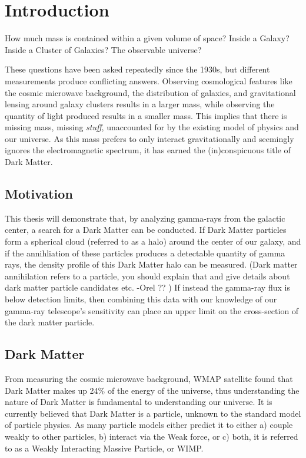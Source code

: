 \cleartooddpage[\thispagestyle{empty}]
\chapter{Introduction}

How much mass is contained within a given volume of space?
Inside a Galaxy?
Inside a Cluster of Galaxies?
The observable universe?

These questions have been asked repeatedly since the 1930s, but different measurements produce conflicting answers.
Observing cosmological features like the cosmic microwave background, the distribution of galaxies, and gravitational lensing around galaxy clusters results in a larger mass, while observing the quantity of light produced results in a smaller mass.
This implies that there is missing mass, missing \textit{stuff}, unaccounted for by the existing model of physics and our universe.
As this mass prefers to only interact gravitationally and seemingly ignores the electromagnetic spectrum, it has earned the (in)conspicuous title of Dark Matter.

\section{Motivation}
This thesis will demonstrate that, by analyzing gamma-rays from the galactic center, a search for a Dark Matter can be conducted.
If Dark Matter particles form a spherical cloud (referred to as a halo) around the center of our galaxy, and if the annihliation of these particles produces a detectable quantity of gamma rays, the density profile of this Dark Matter halo can be measured.
(Dark matter annihilation refers to a particle, you should explain that and give details about dark matter particle candidates etc. -Orel ?? )
If instead the gamma-ray flux is below detection limits, then combining this data with our knowledge of our gamma-ray telescope's sensitivity can place an upper limit on the cross-section of the dark matter particle.

\section{Dark Matter}

From measuring the cosmic microwave background, WMAP satellite found that Dark Matter makes up 24\% of the energy of the universe\cite{pdg_2012}, thus understanding the nature of Dark Matter is fundamental to understanding our universe.
It is currently believed that Dark Matter is a particle, unknown to the standard model of particle physics.
As many particle models either predict it to either a) couple weakly to other particles, b) interact via the Weak force, or c) both, it is referred to as a Weakly Interacting Massive Particle, or WIMP.


